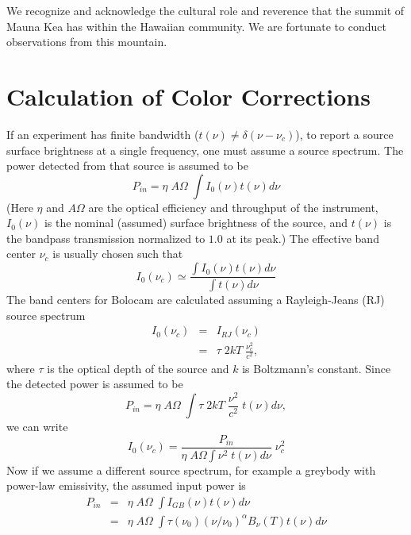 \documentclass{emulateapj}
\begin{document}
We recognize and acknowledge the cultural role and reverence that the
summit of Mauna Kea has within the Hawaiian community. We are
fortunate to conduct observations from this mountain.


\appendix

\section{Calculation of Color Corrections}
\label{app:ColorCorrections}

If an experiment has finite bandwidth ($t(\nu) \ne \delta(\nu -
\nu_c)$), to report a source surface brightness at a single
frequency, one must assume a source spectrum.  The power detected from
that source is assumed to be
\begin{equation}
P_{in} = \eta \; A \Omega \; \int I_0(\nu) t(\nu) d \nu
\end{equation}
(Here $\eta$ and $A \Omega$ are the optical efficiency and throughput
of the instrument, $I_0(\nu)$ is the nominal (assumed) surface
brightness of the source, and $t(\nu)$ is the bandpass transmission
normalized to $1.0$ at its peak.)  The effective band center $\nu_c$
is usually chosen such that
\begin{equation}
I_0(\nu_c) \simeq \frac{\int I_0(\nu) t(\nu) d \nu}
{\int t(\nu) d \nu} 
\end{equation}
The band centers for Bolocam are calculated assuming a Rayleigh-Jeans
(RJ) source spectrum
\begin{eqnarray}
I_0(\nu_c) & = & I_{RJ}(\nu_c) \\
\nonumber & = & \tau \; 2 k T \; \frac{\nu_c^2}{c^2},
\end{eqnarray}
where $\tau$ is the optical depth of the source and $k$ is Boltzmann's
constant.  Since the detected power is assumed to be
\begin{equation}
P_{in} = \eta \; A \Omega \; \int \tau \; 2 k T \; \frac{\nu^2}{c^2}
\; t(\nu) d \nu,
\end{equation}
we can write
\begin{equation}
I_0(\nu_c) = \frac{P_{in}}{\eta \; A \Omega \int \nu^2 \; t(\nu) d \nu} \; \nu_c^2
\end{equation}
Now if we assume a different source spectrum, for example a greybody
with power-law emissivity, the assumed input power is
\begin{eqnarray}
P_{in} & = & \eta \; A \Omega \; \int I_{GB}(\nu) t(\nu) d \nu \\
\nonumber & = & \eta \; A \Omega \; \int \tau(\nu_0) (\nu / \nu_0)^\alpha B_\nu(T) t(\nu) d \nu
\end{eqnarray}
\end{document}
